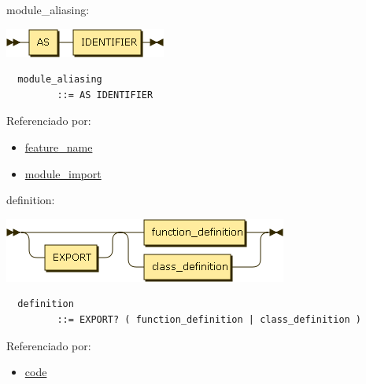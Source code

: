 \begin{minipage}{\textwidth}
  \protect\hypertarget{module_aliasing}{}{module\_aliasing:}

  \includegraphics[width=2.08333in,height=0.37500in]{diagram/module_aliasing.png}

  \begin{verbatim}
  module_aliasing
         ::= AS IDENTIFIER
  \end{verbatim}

  Referenciado por:

  \begin{itemize}
      \tightlist%
    \item
      \protect\hyperlink{feature_name}{feature\_name}
    \item
      \protect\hyperlink{module_import}{module\_import}
  \end{itemize}

\end{minipage}

\begin{minipage}{\textwidth}
  \protect\hypertarget{definition}{}{definition:}

  \includegraphics[width=3.66667in,height=0.83333in]{diagram/definition.png}

  \begin{verbatim}
  definition
         ::= EXPORT? ( function_definition | class_definition )
  \end{verbatim}

  Referenciado por:

  \begin{itemize}
      \tightlist%
    \item
      \protect\hyperlink{code}{code}
  \end{itemize}

\end{minipage}

